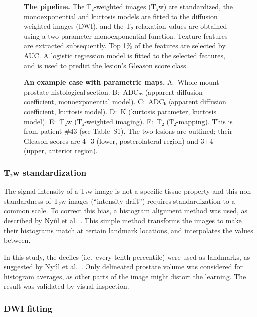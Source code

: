 \documentclass[10pt,letterpaper]{article}
\begin{document}
\begin{figure}[!ht]
    \centering
    \caption{{\bf The pipeline.}
    The T₂-weighted images (T₂w) are standardized, the monoexponential and
    kurtosis models are fitted to the diffusion weighted images (DWI), and the
    T₂ relaxation values are obtained using a two parameter monoexponential
    function. Texture features are extracted subsequently. Top 1\% of the
    features are selected by AUC\@. A logistic regression model is fitted to the
    selected features, and is used to predict the lesion's Gleason score
    class.}%
    \label{fig:pipeline}
\end{figure}

\begin{figure}[!ht]
    \centering
    \caption{{\bf An example case with parametric maps.}
    A:~Whole mount prostate histological section.
    B:~ADCₘ (apparent diffusion coefficient, monoexponential model).
    C:~ADCₖ (apparent diffusion coefficient, kurtosis model).
    D:~K (kurtosis parameter, kurtosis model).
    E:~T₂w (T₂-weighted imaging).
    F:~T₂ (T₂-mapping).
    This is from patient \#43 (see Table~S1). The two lesions are outlined;
    their Gleason scores are 4+3 (lower, posterolateral region) and 3+4 (upper,
    anterior region).}%
    \label{fig:pmap}
\end{figure}

\subsubsection{T₂w standardization}

The signal intensity of a T₂w image is not a specific tissue property and
this non-standardness of T₂w images (``intensity drift'') requires
standardization to a common scale. To correct this bias, a histogram alignment
method was used, as described by Nyúl et al.\ \cite{Nyul1999, Nyul2000}. This
simple method transforms the images to make their histograms match at certain
landmark locations, and interpolates the values between.

In this study, the deciles (i.e.\ every tenth percentile) were used as
landmarks, as suggested by Nyúl et al.\ \cite{Nyul1999}. Only delineated
prostate volume was considered for histogram averages, as other parts of the
image might distort the learning. The result was validated by visual inspection.

\subsubsection{DWI fitting}
\end{document}
